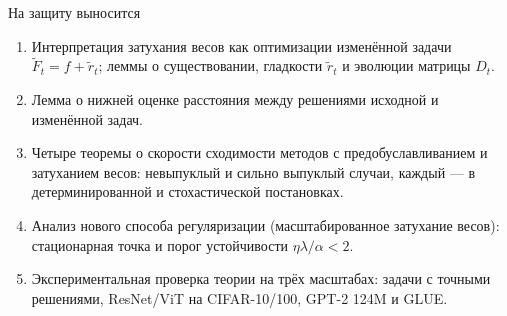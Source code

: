 \documentclass[aspectratio=169, 12pt]{beamer}
\begin{document}
\begin{frame}{На защиту выносится}
    \begin{enumerate}
        \item Интерпретация затухания весов как оптимизации изменённой задачи $\widetilde{F}_t = f + \widetilde{r}_t$; леммы о существовании, гладкости $\widetilde{r}_t$ и эволюции матрицы $D_t$.
        \item Лемма о нижней оценке расстояния между решениями исходной и изменённой задач.
        \item Четыре теоремы о скорости сходимости методов с предобуславливанием и затуханием весов: невыпуклый и сильно выпуклый случаи, каждый --- в детерминированной и стохастической постановках.
        \item Анализ нового способа регуляризации (масштабированное затухание весов): стационарная точка и порог устойчивости $\eta\lambda/\alpha < 2$.
        \item Экспериментальная проверка теории на трёх масштабах: задачи с точными решениями, ResNet/ViT на CIFAR-10/100, GPT-2 124M и GLUE.
    \end{enumerate}
\end{frame}
\end{document}
